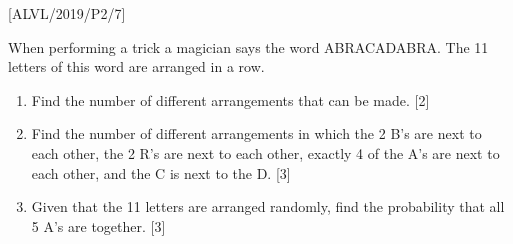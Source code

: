 \item {[}ALVL/2019/P2/7{]} 

When performing a trick a magician says the word ABRACADABRA. The
11 letters of this word are arranged in a row. 
\begin{enumerate}
\item Find the number of different arrangements that can be made. \hfill{}
{[}2{]}
\item Find the number of different arrangements in which the 2 B\textquoteright s
are next to each other, the 2 R\textquoteright s are next to each
other, exactly 4 of the A\textquoteright s are next to each other,
and the C is next to the D. \hfill{}{[}3{]}
\item Given that the 11 letters are arranged randomly, find the probability
that all 5 A\textquoteright s are together. \hfill{}{[}3{]}
\end{enumerate}
